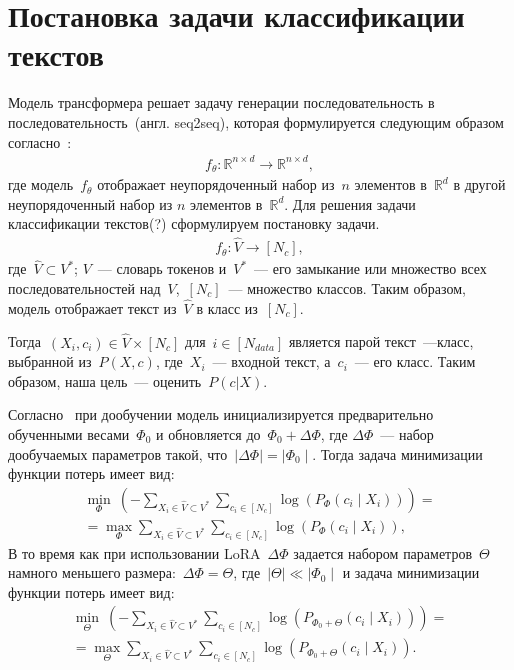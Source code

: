 \newpage


\section{Постановка задачи классификации текстов}
Модель трансформера решает задачу генерации последовательность в последовательность~(англ. seq2seq), которая формулируется следующим образом согласно~\cite{thickstun2021transformer}: 
\begin{align}
f_\theta: \mathbb{R}^{n \times d} \rightarrow \mathbb{R}^{n \times d},   
\end{align}
где модель~$f_{\theta}$ отображает неупорядоченный набор из~$n$ элементов в~$\mathbb{R}^{d}$ в другой неупорядоченный набор из $n$ элементов в~$\mathbb{R}^{d}$. Для решения задачи классификации текстов(?) сформулируем постановку задачи.
\begin{align}
f_\theta : \hat{V} \rightarrow [N_c],
\end{align}
где~$\hat{V} \subset V^{*}$; $V$~--- словарь токенов и~$V^{*}$~--- его замыкание или множество всех последовательностей над~$V$,~$[N_c]$~--- множество классов. Таким образом, модель отображает текст из~$\hat{V}$ в класс из~$[N_c]$.

Тогда~$(X_i, c_i) \in \hat{V} \times [N_c]$ для~$i \in [N_{data}]$ является парой текст~---класс, выбранной из~$P(X, c)$, где~$X_i$~--- входной текст, а~$c_i$~--- его класс. Таким образом, наша цель~--- оценить~$P(c|X)$.

Согласно~\cite{hu2021lora} при дообучении модель инициализируется предварительно обученными весами~$\Phi_0$ и обновляется до~$\Phi_0 + \Delta\Phi$, где $\Delta\Phi$~--- набор дообучаемых параметров такой, что~$\mid\Delta\Phi\mid = \mid\Phi_0\mid$. Тогда задача минимизации функции потерь имеет вид:
\begin{equation}
\label{eq:12} 
\begin{aligned}
\min _{\Phi}~(-\sum_{X_i \in \hat{V} \subset V^{*}} \sum_{c_i \in [N_c]} \log \left(P_{\Phi}\left(c_i \mid X_i\right)\right)) =\\ 
= \max _{\Phi} \sum_{X_i \in \hat{V} \subset V^{*}} \sum_{c_i \in [N_c]} \log \left(P_{\Phi}\left(c_i \mid X_i\right)\right),
\end{aligned}
\end{equation}
В то время как при использовании LoRA~$\Delta\Phi$ задается набором параметров~$\Theta$ намного меньшего размера:~$\Delta\Phi = \Theta$, где~$\mid\Theta\mid \ll \mid\Phi_0\mid$ и задача минимизации функции потерь имеет вид:
\begin{equation}
\label{eq:13}
\begin{aligned}
\min _{\Theta}~(-\sum_{X_i \in \hat{V} \subset V^{*}} \sum_{c_i \in [N_c]} \log \left(P_{\Phi_0+\Theta}\left(c_i \mid X_i\right)\right)) =\\
= \max _{\Theta} \sum_{X_i \in \hat{V} \subset V^{*}} \sum_{c_i \in [N_c]} \log \left(P_{\Phi_0+\Theta}\left(c_i \mid X_i\right)\right). 
\end{aligned}
\end{equation}


